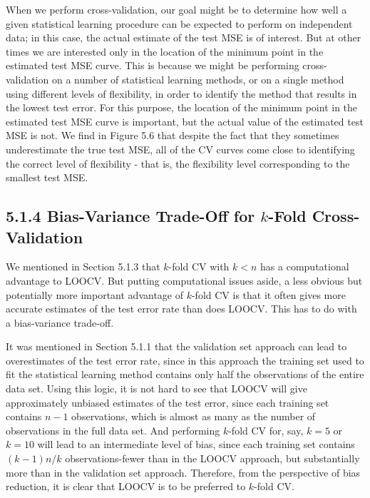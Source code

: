 \documentclass[10pt]{article}
\begin{document}
When we perform cross-validation, our goal might be to determine how well a given statistical learning procedure can be expected to perform on independent data; in this case, the actual estimate of the test MSE is of interest. But at other times we are interested only in the location of the minimum point in the estimated test MSE curve. This is because we might be performing cross-validation on a number of statistical learning methods, or on a single method using different levels of flexibility, in order to identify the method that results in the lowest test error. For this purpose, the location of the minimum point in the estimated test MSE curve is important, but the actual value of the estimated test MSE is not. We find in Figure 5.6 that despite the fact that they sometimes underestimate the true test MSE, all of the CV curves come close to identifying the correct level of flexibility - that is, the flexibility level corresponding to the smallest test MSE.

\subsection*{5.1.4 Bias-Variance Trade-Off for $k$-Fold Cross-Validation}
We mentioned in Section 5.1.3 that $k$-fold CV with $k<n$ has a computational advantage to LOOCV. But putting computational issues aside, a less obvious but potentially more important advantage of $k$-fold CV is that it often gives more accurate estimates of the test error rate than does LOOCV. This has to do with a bias-variance trade-off.

It was mentioned in Section 5.1.1 that the validation set approach can lead to overestimates of the test error rate, since in this approach the training set used to fit the statistical learning method contains only half the observations of the entire data set. Using this logic, it is not hard to see that LOOCV will give approximately unbiased estimates of the test error, since each training set contains $n-1$ observations, which is almost as many as the number of observations in the full data set. And performing $k$-fold CV for, say, $k=5$ or $k=10$ will lead to an intermediate level of bias, since each training set contains $(k-1) n / k$ observations-fewer than in the LOOCV approach, but substantially more than in the validation set approach. Therefore, from the perspective of bias reduction, it is clear that LOOCV is to be preferred to $k$-fold CV.
\end{document}
